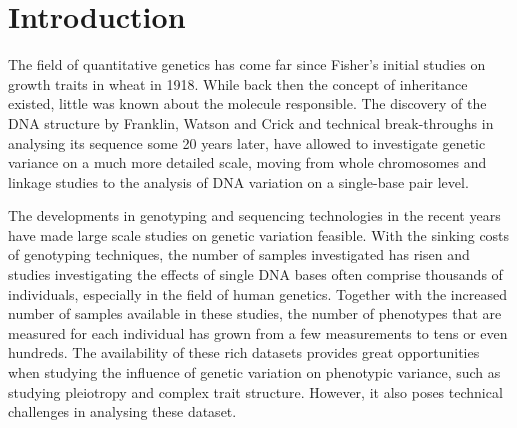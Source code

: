 \chapter{Introduction}
The field of quantitative genetics has come far since Fisher's initial studies on growth traits in wheat in 1918. While back then the concept of inheritance existed, little was known about the molecule responsible. The discovery of the DNA structure by Franklin, Watson and Crick and technical break-throughs in analysing its sequence some 20 years later, have allowed to investigate genetic variance on a much more detailed scale, moving from whole chromosomes and linkage studies to the analysis of DNA variation on a single-base pair level. 

The developments in genotyping and sequencing technologies in the recent years have made large scale studies on genetic variation feasible. With the sinking costs of genotyping techniques, the number of samples investigated has risen and studies investigating the effects of single DNA bases often comprise thousands of individuals, especially in the field of human genetics.  Together with the increased number of samples available in these studies, the number of phenotypes that are measured for each individual has grown from a few measurements to tens or even hundreds. The availability of these rich datasets provides great opportunities when studying the influence of genetic variation on phenotypic variance, such as studying pleiotropy and complex trait structure. However, it also poses technical challenges in analysing these dataset. 


